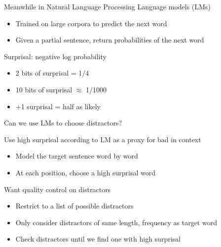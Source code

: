 \documentclass[12pt, xcolor=beamer,table,usenames,dvipsnames, ignorenonframetext, ngerman]{beamer}
\begin{document}
\begin{frame}{Meanwhile in Natural Language Processing}
\pause
Language models (LMs)
\begin{itemize}
	\item Trained on large corpora to predict the next word
	\item Given a partial sentence, return probabilities of the next word
\end{itemize}
\pause
Surprisal: negative log probability
\begin{itemize}
	\item 2 bits of surprisal = 1/4
	\item 10 bits of surprisal $\approx$ 1/1000 
	\item +1 surprisal = half as likely
\end{itemize}
\pause
{}
\end{frame}

\begin{frame}{Can we use LMs to choose distractors?} 

Use high surprisal according to LM as a proxy for bad in context
\medskip

\pause

\begin{itemize}
	\item Model the target sentence word by word \pause
	\item At each position, choose a high surprisal word
\end{itemize}
\medskip
\pause
Want quality control on distractors
\pause
\begin{itemize}
	\item Restrict to a list of possible distractors \pause
	\item Only consider distractors of same length, frequency as target word \pause
	\item Check distractors until we find one with high surprisal \pause
\end{itemize}

\end{frame}
\end{document}
